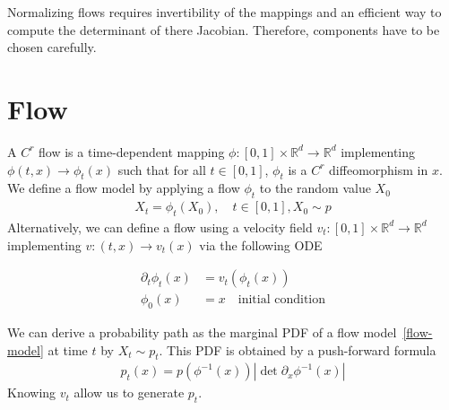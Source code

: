 \documentclass{article}
\begin{document}
\bigskip
Normalizing flows requires invertibility of the mappings and an efficient way to compute the determinant of there Jacobian. Therefore, components have to be chosen carefully.

\section{Flow}
A $C^r$ flow is a time-dependent mapping $\phi : [0,1]\times \mathbb{R}^d\rightarrow\mathbb{R}^d$ implementing $\phi(t,x) \rightarrow \phi_t(x)$ such that for all $t\in[0,1]$, $\phi_t$ is a $C^r$ diffeomorphism in $x$.
We define a flow model by applying a flow $\phi_t$ to the random value $X_0$
\begin{align}\label{flow-model}
    X_t=\phi_t(X_0), \quad t \in[0,1], X_0\sim p 
\end{align}
Alternatively, we can define a flow using a velocity field \(v_t:[0,1]\times\mathbb{R}^d\rightarrow \mathbb{R}^d\) implementing \(v:(t,x)\rightarrow v_t(x)\) via the following ODE 

\begin{align}\label{ODE}
    \partial_t \phi_t(x)&=v_t(\phi_t(x))\\
    \phi_0(x)&=x \quad \text{initial condition}
\end{align}

We can derive a probability path as the marginal PDF of a flow model~\ref{flow-model} at time \(t\) by \(X_t\sim p_t\). This PDF is obtained by a push-forward formula 
\begin{align}\label{pushforward}
    p_t(x) = p(\phi^{-1}(x))|\det \partial_x \phi^{-1}(x)|
\end{align} 
Knowing \(v_t\) allow us to generate \(p_t\).

\begin{comment}
\section{Continuous normalizing flow}

In continuous normalizing flow framework, \(f\) is obtained using a continuous dynamic 
\begin{align}
    \frac{\partial x_0}{\partial t} = f(x_t,t)
\end{align}
In continuous normalizing flows, \(f\) is obtzined by solving the neural ODE 
\begin{align}
    x_T = x_0+\int_0^T f(x_t,t)^{\theta} dt
\end{align}

CNF are trained by maximizing the log-likelyhood 
\begin{align}
    \mathcal{L}(\theta) = \mathbb{E}[\log p(x)]
\end{align}
\end{comment}
\end{document}
